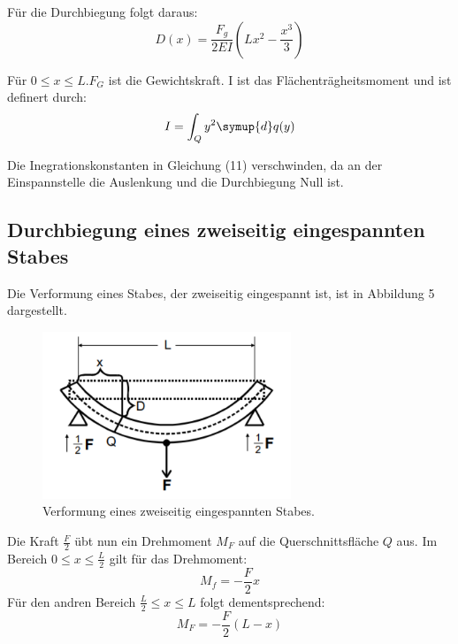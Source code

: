 

Für die Durchbiegung folgt daraus:
\begin{equation}
  D(x) = \frac{F_g}{2EI} \left(Lx^2 - \frac{x^3}{3} \right)
\end{equation}

Für $0 \leq x \leq L$.$F_G$ ist die Gewichtskraft. I ist das Flächenträgheitsmoment und ist definert durch:
\begin{equation}
  I = \int_Q y^2 \symup{d}q(y)
\end{equation}

Die Inegrationskonstanten in Gleichung (11) verschwinden, da an der Einspannstelle
die Auslenkung und die Durchbiegung Null ist.

\subsection{Durchbiegung eines zweiseitig eingespannten Stabes}
Die Verformung eines Stabes, der zweiseitig eingespannt ist, ist in Abbildung 5
dargestellt.

\begin{figure}[H]
  \centering
  \includegraphics[height=5cm]{zweiseitig.PNG}
  \caption{Verformung eines zweiseitig eingespannten Stabes. \cite{sample}}
  \label{fig:zweiseitig}
\end{figure}

Die Kraft $\frac{F}{2}$ übt nun ein Drehmoment $M_F$ auf die Querschnittsfläche $Q$ aus.
Im Bereich $0 \leq x \leq \frac{L}{2}$ gilt für das Drehmoment:
\begin{equation}
  M_f = -\frac{F}{2}x
\end{equation}
Für den andren Bereich $\frac{L}{2} \leq x \leq L$ folgt dementsprechend:
\begin{equation}
  M_F = -\frac{F}{2}(L - x)
\end{equation}

